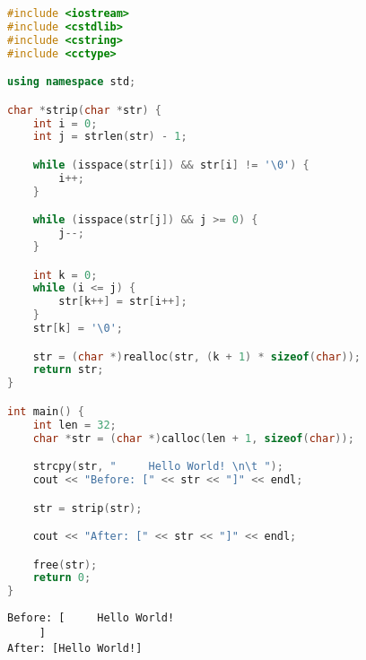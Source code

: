 
\begin{lstlisting}[language=C++]
#include <iostream>
#include <cstdlib>
#include <cstring>
#include <cctype>

using namespace std;

char *strip(char *str) {
    int i = 0;
    int j = strlen(str) - 1;

    while (isspace(str[i]) && str[i] != '\0') {
        i++;
    }

    while (isspace(str[j]) && j >= 0) {
        j--;
    }

    int k = 0;
    while (i <= j) {
        str[k++] = str[i++];
    }
    str[k] = '\0';

    str = (char *)realloc(str, (k + 1) * sizeof(char));
    return str;
}

int main() {
    int len = 32;
    char *str = (char *)calloc(len + 1, sizeof(char));

    strcpy(str, "     Hello World! \n\t ");
    cout << "Before: [" << str << "]" << endl;

    str = strip(str);

    cout << "After: [" << str << "]" << endl;

    free(str);
    return 0;
}
\end{lstlisting}

\begin{tcolorbox}
    \begin{verbatim}
Before: [     Hello World! 
     ]
After: [Hello World!]
	\end{verbatim}
\end{tcolorbox}

\newpage